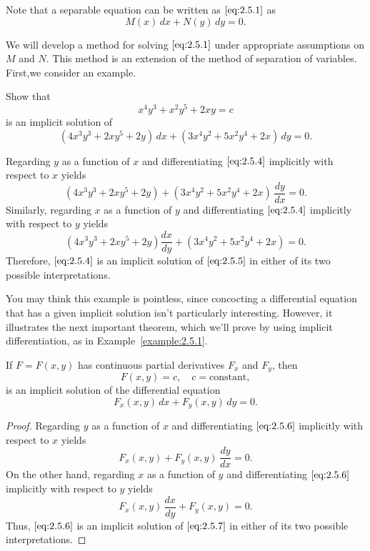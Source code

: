 \documentclass{ximera}
\begin{document}
Note that a separable equation can be written as
$\eqref{eq:2.5.1}$ as
$$
M(x)\,dx+N(y)\,dy=0.
$$
 
 
We will develop a method for solving $\eqref{eq:2.5.1}$ under appropriate
assumptions on $M$ and $N$. This method is an extension
of the method of separation of variables.
First,we
consider an example.
 
\begin{example}\label{example:2.5.1}
Show that
\begin{equation} \label{eq:2.5.4}
x^4y^3+x^2y^5+2xy=c
\end{equation}
is an implicit solution of
\begin{equation} \label{eq:2.5.5}
(4x^3y^3+2xy^5+2y)\,dx+(3x^4y^2+5x^2y^4+2x)\,dy=0.
\end{equation}
 
\begin{explanation}
Regarding $y$ as a function of $x$ and
differentiating $\eqref{eq:2.5.4}$ implicitly with respect to
$x$ yields
$$
(4x^3y^3+2xy^5+2y)+(3x^4y^2+5x^2y^4+2x)\,\frac{dy}{dx}=0.
$$
Similarly, regarding $x$ as a function of $y$ and
differentiating $\eqref{eq:2.5.4}$ implicitly with respect to
$y$ yields
$$
(4x^3y^3+2xy^5+2y)\frac{dx}{dy}+(3x^4y^2+5x^2y^4+2x)=0.
$$
Therefore, $\eqref{eq:2.5.4}$ is an implicit solution of $\eqref{eq:2.5.5}$
in either of its two possible interpretations.
\end{explanation}
\end{example}
 
You may think this example is pointless, since
concocting a differential equation that has a given implicit solution
isn't particularly interesting. However, it illustrates the
next important theorem, which  we'll prove by using implicit
differentiation,  as  in  Example~\ref{example:2.5.1}.
 
\begin{theorem}\label{thmtype:2.5.1}
If $F=F(x,y)$ has continuous partial derivatives
$F_x$ and $F_y$, then
\begin{equation} \label{eq:2.5.6}
F(x,y)=c,\quad c=\text{constant},
\end{equation}
is an implicit solution of the differential equation
\begin{equation} \label{eq:2.5.7}
F_x(x,y)\,dx+F_y(x,y)\,dy=0.
\end{equation}
\end{theorem}
 
\begin{proof} Regarding $y$ as a function of $x$ and  differentiating
$\eqref{eq:2.5.6}$ implicitly with respect to $x$ yields
$$
F_x(x,y)+F_y(x,y)\,\frac{dy}{dx}=0.
$$
On the other hand,
 regarding $x$ as a function of $y$ and  differentiating
$\eqref{eq:2.5.6}$ implicitly with respect to $y$ yields
$$
F_x(x,y)\,\frac{dx}{dy}+F_y(x,y)=0.
$$
Thus, $\eqref{eq:2.5.6}$ is an
implicit solution of  $\eqref{eq:2.5.7}$ in either of its two possible
interpretations.
\end{proof}
 
\end{document}
